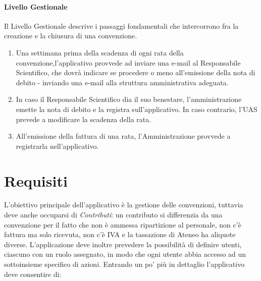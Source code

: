 \paragraph{Livello Gestionale}
Il Livello Gestionale descrive i passaggi fondamentali che intercorrono fra la creazione e la chiusura di una convenzione.\newline
\begin{enumerate}
\item Una settimana prima della scadenza di ogni rata della convenzione,l'applicativo provvede ad inviare una e-mail al Responsabile Scientifico, che dovrà indicare se procedere o meno all'emissione della nota di debito - inviando una e-mail alla struttura amministrativa adeguata.
\item In caso il Responsabile Scientifico dia il suo benestare, l'amministrazione emette la nota di debito e la registra sull'applicativo. In caso contrario, l'UAS prevede a modificare la scadenza della rata.
\item All'emissione della fattura di una rata, l'Amministrazione provvede a registrarla nell'applicativo.\newline
\end{enumerate}

\section{Requisiti}
L'obiettivo principale dell'applicativo è la gestione delle convenzioni, tuttavia deve anche occuparsi di \textsl{Contributi}: un contributo si differenzia da una convenzione per il fatto che non è ammessa ripartizione al personale, non c'è fattura ma solo ricevuta, non c'è IVA e la tassazione di Ateneo ha aliquote diverse.\newline
L'applicazione deve inoltre prevedere la possibilità di definire utenti, ciascuno con un ruolo assegnato, in modo che ogni utente abbia accesso ad un sottoinsieme specifico di azioni. Entrando un po' più in dettaglio l'applicativo deve
consentire di:


